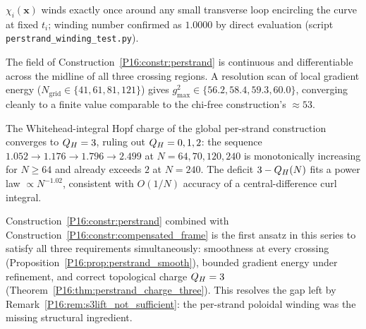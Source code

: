 \begin{proposition}
\label{P16:prop:chi_winds}
$\chi_i(\mathbf{x})$ winds exactly once around any small transverse loop
encircling the curve at fixed $t_i$; winding number confirmed as $1.0000$
by direct evaluation (script \texttt{perstrand\_winding\_test.py}).
\end{proposition}

\begin{proposition}
\label{P16:prop:perstrand_smooth}
The field of Construction~\ref{P16:constr:perstrand} is continuous and
differentiable across the midline of all three crossing regions.
A resolution scan of local gradient energy
($N_{\mathrm{grid}}\in\{41,61,81,121\}$) gives
$g^2_{\max}\in\{56.2,58.4,59.3,60.0\}$, converging cleanly to a finite
value comparable to the chi-free construction's $\approx53$.
\end{proposition}

\begin{theorem}[The corrected per-strand construction restores $\QH=3$]
\label{P16:thm:perstrand_charge_three}
The Whitehead-integral Hopf charge of the global per-strand construction
converges to $\QH=3$, ruling out $Q_H=0,1,2$: the sequence
$1.052\to1.176\to1.796\to2.499$ at $N=64,70,120,240$ is monotonically
increasing for $N\geq64$ and already exceeds $2$ at $N=240$. The deficit
$3-Q_H(N)$ fits a power law $\propto N^{-1.02}$, consistent with
$O(1/N)$ accuracy of a central-difference curl integral.
\end{theorem}

\begin{remark}
\label{P16:rem:perstrand_summary}
Construction~\ref{P16:constr:perstrand} combined with
Construction~\ref{P16:constr:compensated_frame} is the first ansatz in this
series to satisfy all three requirements simultaneously: smoothness at
every crossing (Proposition~\ref{P16:prop:perstrand_smooth}), bounded gradient
energy under refinement, and correct topological charge $\QH=3$
(Theorem~\ref{P16:thm:perstrand_charge_three}). This resolves the gap left
by Remark~\ref{P16:rem:s3lift_not_sufficient}: the per-strand poloidal winding
was the missing structural ingredient.
\end{remark}

